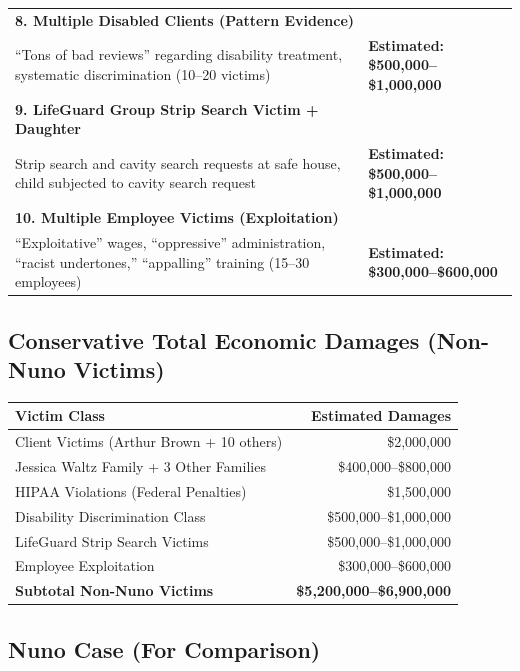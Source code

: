 \documentclass[11pt,letterpaper]{article}
\begin{document}
\begin{longtable}{p{2.5in}p{3.5in}}
\textbf{8. Multiple Disabled Clients (Pattern Evidence)} & \\
``Tons of bad reviews'' regarding disability treatment, systematic discrimination (10--20 victims) & \textbf{Estimated: \$500,000--\$1,000,000}\\
\midrule

\textbf{9. LifeGuard Group Strip Search Victim + Daughter} & \\
Strip search and cavity search requests at safe house, child subjected to cavity search request & \textbf{Estimated: \$500,000--\$1,000,000}\\
\midrule

\textbf{10. Multiple Employee Victims (Exploitation)} & \\
``Exploitative'' wages, ``oppressive'' administration, ``racist undertones,'' ``appalling'' training (15--30 employees) & \textbf{Estimated: \$300,000--\$600,000}\\
\bottomrule
\end{longtable}

\subsection{Conservative Total Economic Damages (Non-Nuno Victims)}

\begin{table}[H]
\centering
\begin{tabular}{lr}
\toprule
\textbf{Victim Class} & \textbf{Estimated Damages}\\
\midrule
Client Victims (Arthur Brown + 10 others) & \$2,000,000\\
Jessica Waltz Family + 3 Other Families & \$400,000--\$800,000\\
HIPAA Violations (Federal Penalties) & \$1,500,000\\
Disability Discrimination Class & \$500,000--\$1,000,000\\
LifeGuard Strip Search Victims & \$500,000--\$1,000,000\\
Employee Exploitation & \$300,000--\$600,000\\
\midrule
\textbf{Subtotal Non-Nuno Victims} & \textbf{\$5,200,000--\$6,900,000}\\
\bottomrule
\end{tabular}
\end{table}

\subsection{Nuno Case (For Comparison)}
\end{document}
